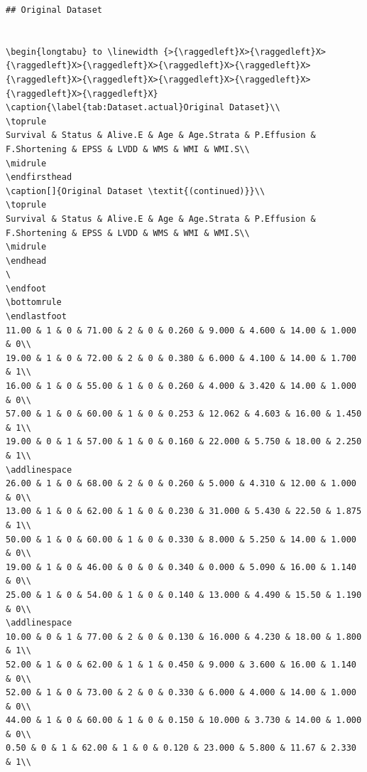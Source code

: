 \documentclass[
]{article}
\begin{document}
\begin{verbatim}
## Original Dataset


\begin{longtabu} to \linewidth {>{\raggedleft}X>{\raggedleft}X>{\raggedleft}X>{\raggedleft}X>{\raggedleft}X>{\raggedleft}X>{\raggedleft}X>{\raggedleft}X>{\raggedleft}X>{\raggedleft}X>{\raggedleft}X>{\raggedleft}X}
\caption{\label{tab:Dataset.actual}Original Dataset}\\
\toprule
Survival & Status & Alive.E & Age & Age.Strata & P.Effusion & F.Shortening & EPSS & LVDD & WMS & WMI & WMI.S\\
\midrule
\endfirsthead
\caption[]{Original Dataset \textit{(continued)}}\\
\toprule
Survival & Status & Alive.E & Age & Age.Strata & P.Effusion & F.Shortening & EPSS & LVDD & WMS & WMI & WMI.S\\
\midrule
\endhead
\
\endfoot
\bottomrule
\endlastfoot
11.00 & 1 & 0 & 71.00 & 2 & 0 & 0.260 & 9.000 & 4.600 & 14.00 & 1.000 & 0\\
19.00 & 1 & 0 & 72.00 & 2 & 0 & 0.380 & 6.000 & 4.100 & 14.00 & 1.700 & 1\\
16.00 & 1 & 0 & 55.00 & 1 & 0 & 0.260 & 4.000 & 3.420 & 14.00 & 1.000 & 0\\
57.00 & 1 & 0 & 60.00 & 1 & 0 & 0.253 & 12.062 & 4.603 & 16.00 & 1.450 & 1\\
19.00 & 0 & 1 & 57.00 & 1 & 0 & 0.160 & 22.000 & 5.750 & 18.00 & 2.250 & 1\\
\addlinespace
26.00 & 1 & 0 & 68.00 & 2 & 0 & 0.260 & 5.000 & 4.310 & 12.00 & 1.000 & 0\\
13.00 & 1 & 0 & 62.00 & 1 & 0 & 0.230 & 31.000 & 5.430 & 22.50 & 1.875 & 1\\
50.00 & 1 & 0 & 60.00 & 1 & 0 & 0.330 & 8.000 & 5.250 & 14.00 & 1.000 & 0\\
19.00 & 1 & 0 & 46.00 & 0 & 0 & 0.340 & 0.000 & 5.090 & 16.00 & 1.140 & 0\\
25.00 & 1 & 0 & 54.00 & 1 & 0 & 0.140 & 13.000 & 4.490 & 15.50 & 1.190 & 0\\
\addlinespace
10.00 & 0 & 1 & 77.00 & 2 & 0 & 0.130 & 16.000 & 4.230 & 18.00 & 1.800 & 1\\
52.00 & 1 & 0 & 62.00 & 1 & 1 & 0.450 & 9.000 & 3.600 & 16.00 & 1.140 & 0\\
52.00 & 1 & 0 & 73.00 & 2 & 0 & 0.330 & 6.000 & 4.000 & 14.00 & 1.000 & 0\\
44.00 & 1 & 0 & 60.00 & 1 & 0 & 0.150 & 10.000 & 3.730 & 14.00 & 1.000 & 0\\
0.50 & 0 & 1 & 62.00 & 1 & 0 & 0.120 & 23.000 & 5.800 & 11.67 & 2.330 & 1\\

\end{verbatim}
\end{document}
